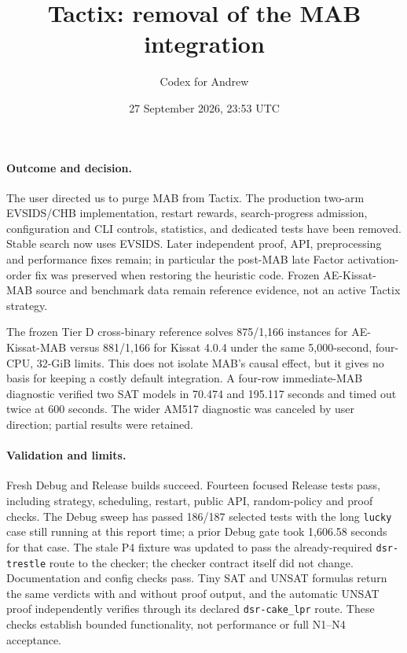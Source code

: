 \documentclass[11pt]{article}
\title{Tactix: removal of the MAB integration}
\author{Codex for Andrew}
\date{27 September 2026, 23:53 UTC}
\begin{document}
\maketitle

\paragraph{Outcome and decision.}
The user directed us to purge MAB from Tactix. The production two-arm
EVSIDS/CHB implementation, restart rewards, search-progress admission,
configuration and CLI controls, statistics, and dedicated tests have been
removed. Stable search now uses EVSIDS. Later independent proof, API,
preprocessing and performance fixes remain; in particular the post-MAB late
Factor activation-order fix was preserved when restoring the heuristic code.
Frozen AE-Kissat-MAB source and benchmark data remain reference evidence, not
an active Tactix strategy.

The frozen Tier D cross-binary reference solves 875/1,166 instances for
AE-Kissat-MAB versus 881/1,166 for Kissat 4.0.4 under the same 5,000-second,
four-CPU, 32-GiB limits. This does not isolate MAB's causal effect, but it gives
no basis for keeping a costly default integration. A four-row immediate-MAB
diagnostic verified two SAT models in 70.474 and 195.117 seconds and timed out
twice at 600 seconds. The wider AM517 diagnostic was canceled by user direction;
partial results were retained.

\paragraph{Validation and limits.}
Fresh Debug and Release builds succeed. Fourteen focused Release tests pass,
including strategy, scheduling, restart, public API, random-policy and proof
checks. The Debug sweep has passed 186/187 selected tests with the long
\texttt{lucky} case still running at this report time; a prior Debug gate took
1,606.58 seconds for that case. The stale P4 fixture was updated to pass the
already-required \texttt{dsr-trestle} route to the checker; the checker contract
itself did not change. Documentation and config checks pass. Tiny SAT and UNSAT
formulas return the same verdicts with and without proof output, and the
automatic UNSAT proof independently verifies through its declared
\texttt{dsr-cake\_lpr} route. These checks establish bounded functionality,
not performance or full N1--N4 acceptance.
\end{document}

